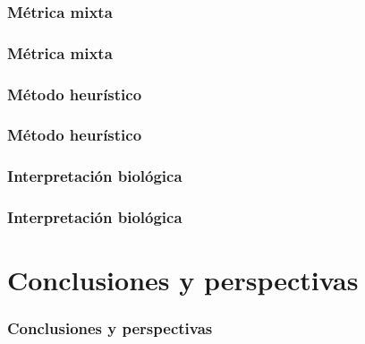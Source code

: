 \documentclass[serif,9pt, t]{beamer}
\begin{document}
\subsubsection*{Métrica mixta}
\begin{frame}
\frametitle{Métrica mixta} 
\end{frame}
\subsubsection*{Método heurístico}
\begin{frame}
\frametitle{Método heurístico} 
\end{frame}
\subsubsection*{Interpretación biológica}
\begin{frame}
\frametitle{Interpretación biológica} 
\end{frame}
\section{Conclusiones y perspectivas}
\begin{frame}
\frametitle{Conclusiones y perspectivas} 
\end{frame}
\end{document}
